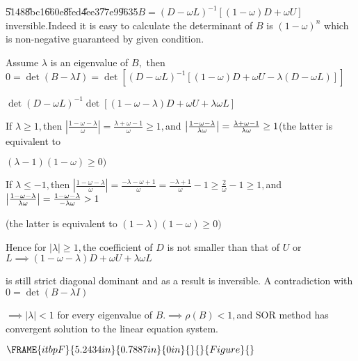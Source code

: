 \documentclass{article}
\begin{document}
\U{5148}\U{8bc1}\U{660e}\U{8fed}\U{4ee3}\U{77e9}\U{9635}$B=\left( D-\omega
L\right) ^{-1}\left[ \left( 1-\omega \right) D+\omega U\right] $
inversible.Indeed it is easy to calculate the determinant of $B$ is $\left(
1-\omega \right) ^{n}$ which is non-negative guaranteed by given condition.

Assume $\lambda $ is an eigenvalue of $B,$ then $0=\det \left( B-\lambda
I\right) =\det \left[ \left( D-\omega L\right) ^{-1}\left[ \left( 1-\omega
\right) D+\omega U-\lambda \left( D-\omega L\right) \right] \right] $

$\det \left( D-\omega L\right) ^{-1}\det [\left( 1-\omega -\lambda \right)
D+\omega U+\lambda \omega L]$

If $\lambda \geq 1,$then $\left\vert \frac{1-\omega -\lambda }{\omega }%
\right\vert =\frac{\lambda +\omega -1}{\omega }\geq 1,$and $\left\vert \frac{%
1-\omega -\lambda }{\lambda \omega }\right\vert =\frac{\lambda +\omega -1}{%
\lambda \omega }\geq 1$(the latter is equivalent to

$\left( \lambda -1\right) \left( 1-\omega \right) \geq 0)$

If $\lambda \leq -1,$then $\left\vert \frac{1-\omega -\lambda }{\omega }%
\right\vert =\frac{-\lambda -\omega +1}{\omega }=\frac{-\lambda +1}{\omega }%
-1\geq \frac{2}{\omega }-1\geq 1,$and $\left\vert \frac{1-\omega -\lambda }{%
\lambda \omega }\right\vert =\frac{1-\omega -\lambda }{-\lambda \omega }>1$

(the latter is equivalent to $\left( 1-\lambda \right) \left( 1-\omega
\right) \geq 0)$

Hence for $\left\vert \lambda \right\vert \geq 1,$the coefficient of $D$ is
not smaller than that of $U$ or $L\implies \left( 1-\omega -\lambda \right)
D+\omega U+\lambda \omega L$

is still strict diagonal dominant and as a result is inversible. A
contradiction with $0=\det \left( B-\lambda I\right) $

$\implies \left\vert \lambda \right\vert <1$ for every eigenvalue of $%
B.\implies \rho \left( B\right) <1,$and SOR method has convergent solution
to the linear equation system.

$\FRAME{itbpF}{5.2434in}{0.7887in}{0in}{}{}{Figure}{\special{language
"Scientific Word";type "GRAPHIC";display "USEDEF";valid_file "T";width
5.2434in;height 0.7887in;depth 0in;original-width 12.8779in;original-height
1.9173in;cropleft "0";croptop "1";cropright "1";cropbottom "0";tempfilename
'NWGNMK05.wmf';tempfile-properties "XPR";}}$
\end{document}
